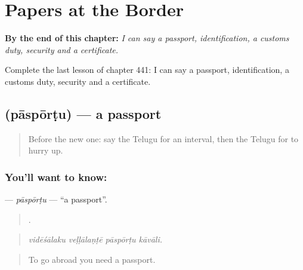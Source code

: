 
\chapter{Papers at the Border}
\label{ch:te-papers-at-the-border}

\begin{chapteropening}
\textbf{By the end of this chapter:} \emph{I can say a passport, identification, a customs duty, security and a certificate.}

Complete the last lesson of chapter 441: I can say a passport, identification, a customs duty, security and a certificate.
\end{chapteropening}

\section[\texorpdfstring{\te{పాస్పోర్టు} (pāspōrṭu)}{పాస్పోర్టు (pāspōrṭu)}]{ (pāspōrṭu) — a passport}

\label{lesson:TE-C441-pasportu}



\begin{quote}
Before the new one: say the Telugu for an interval, then the Telugu for to hurry up.
\end{quote}

\subsection*{You'll want to know: }
\textbf{} — \emph{pāspōrṭu} — \textquotedblleft{}a passport\textquotedblright{}.

\begin{quote}
   .
\end{quote}

\begin{quote}
\emph{vidēśālaku veḷḷālaṇṭē pāspōrṭu kāvāli.}
\end{quote}

\begin{quote}
To go abroad you need a passport.
\end{quote}

